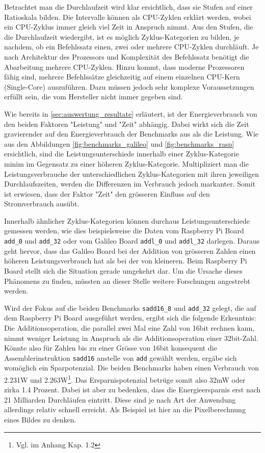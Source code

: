 Betrachtet man die Durchlaufzeit wird klar ersichtlich, dass sie Stufen auf einer Ratioskala bilden. Die Intervalle können als CPU-Zyklen erklärt werden, wobei ein CPU-Zyklus immer gleich viel Zeit in Anspruch nimmt. Aus den Stufen, die die Durchlaufzeit wiedergibt, ist es möglich Zyklus-Kategorien zu bilden, je nachdem, ob ein Befehlssatz einen, zwei oder mehrere CPU-Zyklen durchläuft. Je nach Architektur des Prozessors und Komplexität des Befehlssatz benötigt die Abarbeitung mehrere CPU-Zyklen. Hinzu kommt, dass moderne Prozessoren fähig sind, mehrere Befehlssätze gleichzeitig auf einem einzelnen CPU-Kern (Single-Core) auszuführen. Dazu müssen jedoch sehr komplexe Voraussetzungen erfüllt sein, die vom Hersteller nicht immer gegeben sind.
\par
Wie bereits in \autoref{sec:auswertung_resultate} erläutert, ist der Energieverbrauch von den beiden Faktoren "Leistung" und "Zeit" abhängig. Dabei wirkt sich die Zeit gravierender auf den Energieverbrauch der Benchmarks aus als die Leistung. Wie aus den Abbildungen \autoref{fig:benchmarks_galileo} und \ref{fig:benchmarks_rasp} ersichtlich, sind die Leistungsunterschiede innerhalb einer Zyklus-Kategorie minim im Gegensatz zu einer höheren Zyklus-Kategorie. Multipliziert man die Leistungsverbrauche der unterschiedlichen Zyklus-Kategorien mit ihren jeweiligen Durchlaufszeiten, werden die Differenzen im Verbrauch jedoch markanter. Somit ist erwiesen, dass der Faktor "Zeit" den grösseren Einfluss auf den Stromverbrauch ausübt. 
\par
Innerhalb ähnlicher Zyklus-Kategorien können durchaus Leistungsunterschiede gemessen werden, wie dies beispielsweise die Daten vom Raspberry Pi Board \texttt{add\_0} und \texttt{add\_32} oder vom Galileo Board \texttt{addl\_0} und \texttt{addl\_32} darlegen. Daraus geht hervor, dass das Galileo Board bei der Addition von grösseren Zahlen einen höheren Leistungsverbrauch hat als bei der von kleineren. Beim Raspberry Pi Board stellt sich die Situation gerade umgekehrt dar. Um die Ursache dieses Phänomens zu finden, müssten an dieser Stelle weitere Forschungen angestrebt werden.
\par
Wird der Fokus auf die beiden Benchmarks \texttt{sadd16\_8} und \texttt{add\_32} gelegt, die auf dem Raspberry Pi Board ausgeführt werden, ergibt sich die folgende Erkenntnis: Die Additionsoperation, die parallel zwei Mal eine Zahl von 16bit rechnen kann, nimmt weniger Leistung in Anspruch als die Additionsoperation einer 32bit-Zahl. Könnte also für Zahlen bis zu einer Grösse von 16bit konsequent die Assemblerinstruktion \texttt{sadd16} anstelle von \texttt{add} gewählt werden, ergäbe sich womöglich ein Sparpotenzial. Die beiden Benchmarks haben einen Verbrauch von 2.231W und 2.263W\footnote{Vgl. im Anhang Kap. 1.2}. Das Ersparnispotenzial betrüge somit also 32mW oder zirka 1.4 Prozent. Dabei ist aber zu bedenken, dass die Energieersparnis erst nach 21 Milliarden Durchläufen eintritt. Diese sind je nach Art der Anwendung allerdings relativ schnell erreicht. Als Beispiel ist hier an die Pixelberechnung eines Bildes zu denken.















